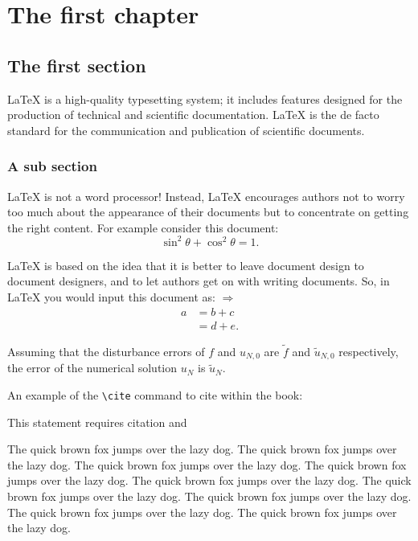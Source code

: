 \documentclass[openany,twoside,12pt]{book}
\theoremstyle{plain}
\numberwithin{equation}{chapter}
\numberwithin{figure}{chapter}
\numberwithin{table}{chapter}
\begin{document}
\cleardoublepage
{}
{}
\tableofcontents


\mainmatter



\chapter{The first chapter}

\section{The first section}\label{my label}
LaTeX is a high-quality typesetting system; it includes features designed for the production of technical and scientific documentation. LaTeX is the de facto standard for the communication and publication of scientific documents.

\subsection{A sub section}
LaTeX is not a word processor! Instead, LaTeX encourages authors not to worry too much about the appearance of their documents but to concentrate on getting the right content. For example consider this document:
\begin{equation}\label{eqn:trifun}
\sin^2{\theta}+\cos^2{\theta}=1.
\end{equation}

LaTeX is based on the idea that it is better to leave document design to document designers, and to let authors get on with writing documents. So, in LaTeX you would input this document as:
$ \Rightarrow $
\begin{align}
a & = b + c \\
& = d + e.
\end{align}

Assuming that the disturbance errors of $f$ and $u_{N,0}$ are $\tilde{f}$ and $\tilde{u}_{N,0}$ respectively, the error of the numerical solution $u_N$ is $\tilde{u}_N$.

An example of the \verb|\cite| command to cite within the book:

This statement requires citation \cite{Adams2003} and \cite{Shen1994,Tadmor2012,TreWei2014}


The quick brown fox jumps over the lazy dog. The quick brown fox jumps over the lazy dog. The quick brown fox jumps over the lazy dog. The quick brown fox jumps over the lazy dog. The quick brown fox jumps over the lazy dog. The quick brown fox jumps over the lazy dog. The quick brown fox jumps over the lazy dog. The quick brown fox jumps over the lazy dog. The quick brown fox jumps over the lazy dog.
\end{document}
